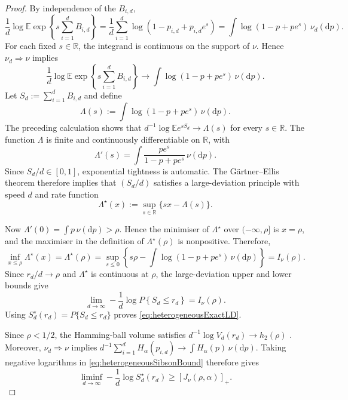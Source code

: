 \documentclass[11pt]{article}
\theoremstyle{definition}
\theoremstyle{remark}
\newcommand{\1}{\boldsymbol{1}}
\begin{document}
\begin{proof}
By independence of the \(B_{i,d}\),
\[
\frac1d\log
\mathbb E\exp\left\{
s\sum_{i=1}^dB_{i,d}
\right\}
=
\frac1d\sum_{i=1}^d
\log(1-p_{i,d}+p_{i,d}e^s)
=
\int\log(1-p+pe^s)\,\nu_d(\mathrm dp).
\]
For each fixed \(s\in\mathbb R\), the integrand is continuous on the
support of \(\nu\). Hence \(\nu_d\Rightarrow\nu\) implies
\[
\frac1d\log
\mathbb E\exp\left\{
s\sum_{i=1}^dB_{i,d}
\right\}
\longrightarrow
\int\log(1-p+pe^s)\,\nu(\mathrm dp).
\]
Let \(S_d:=\sum_{i=1}^dB_{i,d}\) and define
\[
\Lambda(s)
:=
\int\log(1-p+pe^s)\,\nu(\mathrm dp).
\]
The preceding calculation shows that
\(d^{-1}\log\mathbb E e^{sS_d}\to\Lambda(s)\) for every
\(s\in\mathbb R\). The function \(\Lambda\) is finite and continuously
differentiable on \(\mathbb R\), with
\[
\Lambda'(s)
=
\int
\frac{pe^s}{1-p+pe^s}\,
\nu(\mathrm dp).
\]
Since \(S_d/d\in[0,1]\), exponential tightness is automatic. The
G\"artner--Ellis theorem
\cite[Theorem~2.3.6]{DemboZeitouni2010} therefore implies that
\((S_d/d)\) satisfies a large-deviation principle with speed \(d\) and
rate function
\[
\Lambda^\star(x)
:=
\sup_{s\in\mathbb R}\{sx-\Lambda(s)\}.
\]

Now \(\Lambda'(0)=\int p\,\nu(\mathrm dp)>\rho\). Hence the minimiser of
\(\Lambda^\star\) over \((-\infty,\rho]\) is \(x=\rho\), and the
maximiser in the definition of \(\Lambda^\star(\rho)\) is nonpositive.
Therefore,
\[
\inf_{x\le\rho}\Lambda^\star(x)
=
\Lambda^\star(\rho)
=
\sup_{s\le0}
\left\{
s\rho-
\int\log(1-p+pe^s)\,\nu(\mathrm dp)
\right\}
=
I_\nu(\rho).
\]
Since \(r_d/d\to\rho\) and \(\Lambda^\star\) is continuous at \(\rho\),
the large-deviation upper and lower bounds give
\[
\lim_{d\to\infty}
-\frac1d
\log
P\left\{
S_d\le r_d
\right\}
=
I_\nu(\rho).
\]
Using
\(S_d^\star(r_d)=P\{S_d\le r_d\}\) proves
\eqref{eq:heterogeneousExactLD}.

Since \(\rho<1/2\), the Hamming-ball volume satisfies
\(d^{-1}\log V_d(r_d)\to h_2(\rho)\)
\cite[Chapter~11]{CoverThomas2006}. Moreover,
\(\nu_d\Rightarrow\nu\) implies
\(d^{-1}\sum_{i=1}^dH_\alpha(p_{i,d})
\to\int H_\alpha(p)\,\nu(\mathrm dp)\).
Taking negative logarithms in
\eqref{eq:heterogeneousSibsonBound} therefore gives
\[
\liminf_{d\to\infty}
-\frac1d\log S_d^\star(r_d)
\ge
[J_\nu(\rho,\alpha)]_+.
\]


\end{proof}
\end{document}
